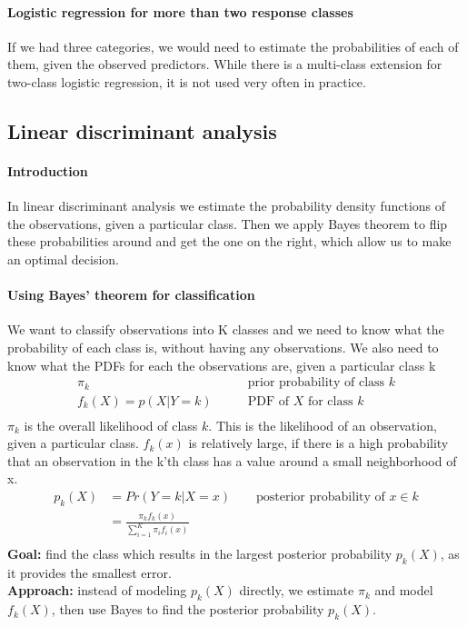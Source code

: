 \documentclass[../document.tex]{subfiles}
\begin{document}
	\paragraph{Logistic regression for more than two response classes}
	If we had three categories, we would need to estimate the probabilities of each of them, given the observed predictors. While there is a multi-class extension for two-class logistic regression, it is not used very often in practice.

	\subsection{Linear discriminant analysis}

	\paragraph{Introduction}
	In linear discriminant analysis we estimate the probability density functions of the observations, given a particular class. Then we apply Bayes theorem to flip these probabilities around and get the one on the right, which allow us to make an optimal decision.

	\paragraph{Using Bayes' theorem for classification}
	We want to classify observations into K classes and we need to know what the probability of each class is, without having any observations.
	We also need to know what the PDFs for each the observations are, given a particular class k
	\begin{equation}
	\begin{split}
		\pi_{k}&\qquad\text{prior probability of class }k\\
		f_{k}(X) = p(X|Y=k)&\qquad\text{PDF of }X\text{ for class }k\\
	\end{split}
	\end{equation}
	$\pi_k$ is the overall likelihood of class $k$.
	This is the likelihood of an observation, given a particular class. \(f_{k}(x)\) is relatively large, if there is a high probability that an observation in the k'th class has a value around a small neighborhood of x.
	\begin{equation}
	\begin{split}
		p_{k}(X)&=Pr(Y=k|X=x)\qquad\text{posterior probability of } x \in k\\
		&=\frac{\pi_{k}f_{k}(x)}{\sum_{i=1}^{K}\pi_{i}f_{i}(x)}\\
	\end{split}
	\end{equation}
	\textbf{Goal:} find the class which results in the largest posterior probability \(p_{k}(X)\), as it provides the smallest error.\\
	\textbf{Approach:} instead of modeling \(p_{k}(X)\) directly, we estimate $\pi_k$ and model $f_{k}(X)$, then use Bayes to find the posterior probability \(p_{k}(X)\).\\
\end{document}
